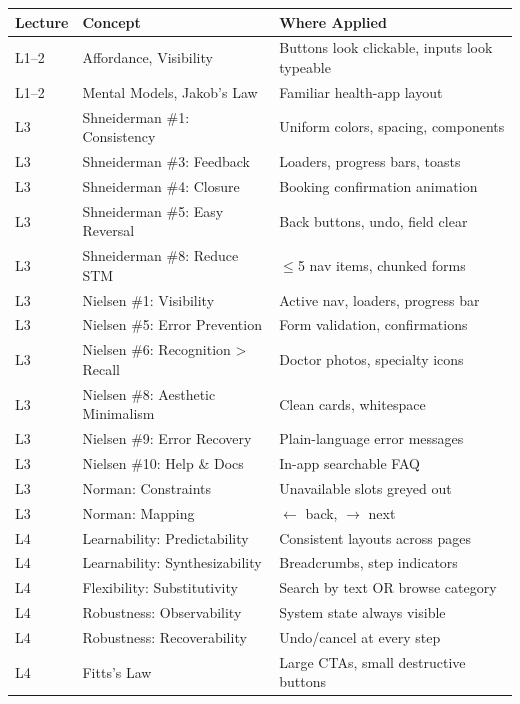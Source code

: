 \documentclass[12pt, a4paper]{article}
\begin{document}
\begin{table}[H]
\centering
\small
\renewcommand{\arraystretch}{1.3}
\begin{tabularx}{\textwidth}{|l|l|X|}
\hline
\textbf{Lecture} & \textbf{Concept} & \textbf{Where Applied} \\
\hline
L1--2 & Affordance, Visibility & Buttons look clickable, inputs look typeable \\
L1--2 & Mental Models, Jakob's Law & Familiar health-app layout \\
\hline
L3 & Shneiderman \#1: Consistency & Uniform colors, spacing, components \\
L3 & Shneiderman \#3: Feedback & Loaders, progress bars, toasts \\
L3 & Shneiderman \#4: Closure & Booking confirmation animation \\
L3 & Shneiderman \#5: Easy Reversal & Back buttons, undo, field clear \\
L3 & Shneiderman \#8: Reduce STM & $\leq$5 nav items, chunked forms \\
\hline
L3 & Nielsen \#1: Visibility & Active nav, loaders, progress bar \\
L3 & Nielsen \#5: Error Prevention & Form validation, confirmations \\
L3 & Nielsen \#6: Recognition > Recall & Doctor photos, specialty icons \\
L3 & Nielsen \#8: Aesthetic Minimalism & Clean cards, whitespace \\
L3 & Nielsen \#9: Error Recovery & Plain-language error messages \\
L3 & Nielsen \#10: Help \& Docs & In-app searchable FAQ \\
\hline
L3 & Norman: Constraints & Unavailable slots greyed out \\
L3 & Norman: Mapping & $\leftarrow$ back, $\rightarrow$ next \\
\hline
L4 & Learnability: Predictability & Consistent layouts across pages \\
L4 & Learnability: Synthesizability & Breadcrumbs, step indicators \\
L4 & Flexibility: Substitutivity & Search by text OR browse category \\
L4 & Robustness: Observability & System state always visible \\
L4 & Robustness: Recoverability & Undo/cancel at every step \\
L4 & Fitts's Law & Large CTAs, small destructive buttons \\

\end{tabularx}
\end{table}
\end{document}
